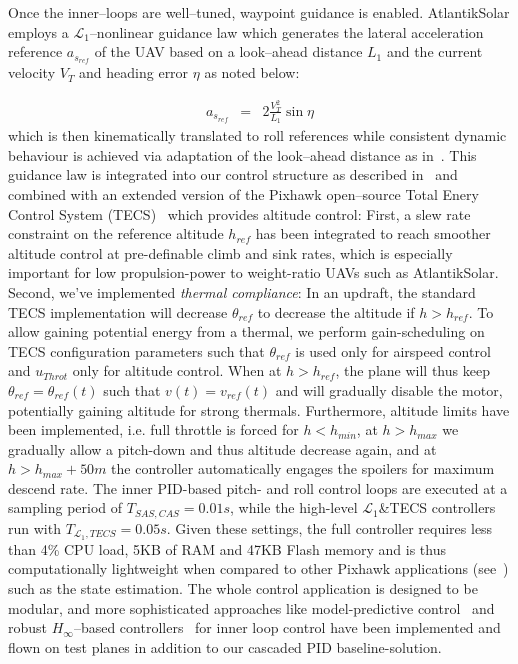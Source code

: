 Once the inner--loops are well--tuned, waypoint guidance is enabled. AtlantikSolar employs a $\mathcal{L}_1$--nonlinear guidance law which generates the lateral acceleration reference $a_{s_{ref}}$ of the UAV based on a look--ahead distance ${L}_1$ and the current velocity $V_T$ and heading error $\eta$ as noted below:

\small
\begin{eqnarray}
 a_{s_{ref}} &=& 2\frac{V_T^2}{L_1}\sin \eta
\end{eqnarray}
\normalsize
which is then kinematically translated to roll references while consistent dynamic behaviour is achieved via adaptation of the look--ahead distance as in~\cite{L1stabAnalysis}. This guidance law is integrated into our control structure as described in~\cite{OMLAS_MED_14} and combined with an extended version of the Pixhawk open--source Total Enery Control System (TECS)~\cite{PixhawkWebsite} which provides altitude control: First, a slew rate constraint on the reference altitude $h_{ref}$ has been integrated to reach smoother altitude control at pre-definable climb and sink rates, which is especially important for low propulsion-power to weight-ratio UAVs such as AtlantikSolar. Second, we've implemented \textit{thermal compliance}: In an updraft, the standard TECS implementation will decrease $\theta_{ref}$ to decrease the altitude if $h>h_{ref}$. To allow gaining potential energy from a thermal, we perform gain-scheduling on TECS configuration parameters such that $\theta_{ref}$ is used only for airspeed control and $u_{Throt}$ only for altitude control. When at $h>h_{ref}$, the plane will thus keep $\theta_{ref}=\theta_{ref}(t)$  such that $v(t)=v_{ref}(t)$ and will gradually disable the motor, potentially gaining altitude for strong thermals. Furthermore, altitude limits have been implemented, i.e. full throttle is forced for $h<h_{min}$, at $h>h_{max}$ we gradually allow a pitch-down and thus altitude decrease again, and at $h>h_{max}+50m$ the controller automatically engages the spoilers for maximum descend rate. The inner PID-based pitch- and roll control loops are executed at a sampling period of $T_{SAS,CAS}=0.01s$, while the high-level $\mathcal{L}_1$\&TECS controllers run with $T_{\mathcal{L}_1,TECS}=0.05s$. Given these settings, the full controller requires less than 4\% CPU load, 5KB of RAM and 47KB Flash memory and is thus computationally lightweight when compared to other Pixhawk applications (see~\cite{OMLAS_MED_14}) such as the state estimation. The whole control application is designed to be modular, and more sophisticated approaches like model-predictive control~\cite{OMLAS_MED_14} and robust $H_\infty$--based controllers~\cite{Mosimann_FT} for inner loop control have been implemented and flown on test planes in addition to our cascaded PID baseline-solution. 